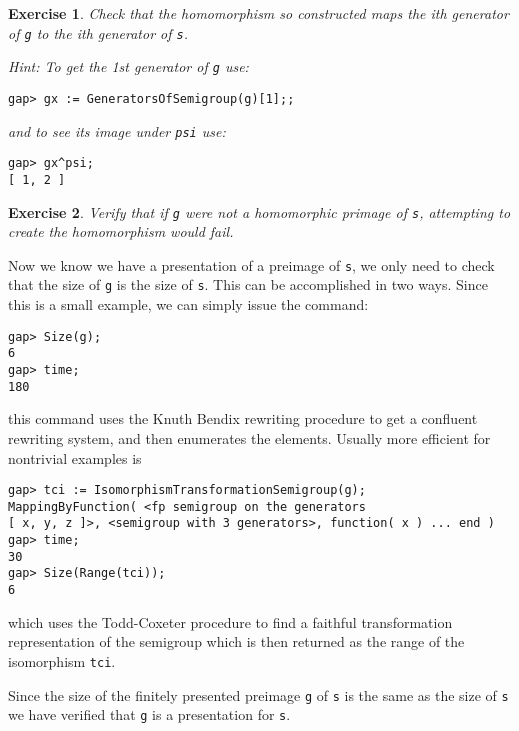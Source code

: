 \documentclass[12pt]{article}
\theoremstyle{plain} \newtheorem{Thm}{Theorem}
\theoremstyle{plain} \newtheorem{Cor}{Corollary}
\theoremstyle{plain} \newtheorem{Lemma}{Lemma}
\theoremstyle{plain} \newtheorem{Prop}{Proposition}
\theoremstyle{plain} \newtheorem{Ex}{Exercise}
\begin{document}
\begin{Ex}
Check that the homomorphism so constructed maps the ith generator
of {\tt g} to the ith generator of {\tt s}.
{\rm Hint: To get the 1st generator of {\tt g} use:
\begin{verbatim}
gap> gx := GeneratorsOfSemigroup(g)[1];;
\end{verbatim}
and to see its image under {\tt psi} use:
\begin{verbatim}
gap> gx^psi;                                      
[ 1, 2 ]
\end{verbatim}}
\end{Ex}

\begin{Ex} 
Verify that if {\tt g} were not a homomorphic primage of {\tt s},
attempting to create  the  homomorphism would fail.
\end{Ex}

Now we know we have a presentation of a preimage of {\tt s}, we only 
need to check that the size of {\tt g} is the size of {\tt s}.
This can be accomplished in two ways. Since this is a small example,
we can simply issue the command:
\begin{verbatim}
gap> Size(g);                                                                  
6
gap> time;
180
\end{verbatim}
this command uses the Knuth Bendix rewriting procedure \cite{simsbook}  to 
get a confluent rewriting system, and then enumerates the elements.
Usually more efficient for nontrivial examples is 
\begin{verbatim}
gap> tci := IsomorphismTransformationSemigroup(g);
MappingByFunction( <fp semigroup on the generators 
[ x, y, z ]>, <semigroup with 3 generators>, function( x ) ... end )
gap> time;
30
gap> Size(Range(tci));
6
\end{verbatim}
which uses the Todd-Coxeter \cite{walker_tc} procedure to find a 
faithful transformation representation of the semigroup which is then
returned as the range of the isomorphism {\tt tci}.

Since the size of the finitely presented preimage {\tt g} of {\tt s} is the
same as the size of {\tt s} we have verified that {\tt g} is a 
presentation for {\tt s}.
\end{document}
